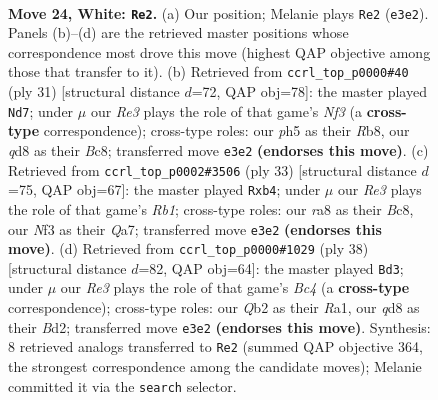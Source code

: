 \documentclass[11pt]{article}
\begin{document}
\clearpage

\begin{figure}[p]\centering
\begin{subfigure}{0.46\textwidth}\centering
\resizebox{\linewidth}{!}{%
\newchessgame
\chessboard[
  setfen={rnbqr1k1/5p2/1p2pnp1/7p/p1PP4/B2BRNPP/PQ3P2/3R2K1 w - - 3 24},
  showmover=false,
  pgfstyle=straightmove, color=movearrow, markmove={e3-e2}
]}
\caption{}
\end{subfigure}\hfill
\begin{subfigure}{0.46\textwidth}\centering
\resizebox{\linewidth}{!}{%
\newchessgame
\chessboard[
  setfen={1rb1r1k1/2p1qpp1/p2p1n1p/P1p5/4PB2/2PP3P/2PN2P1/R2QR1K1 b - - 0 16},
  showmover=false,
  pgfstyle=straightmove, color=movearrow, markmove={f6-d7}
]}
\caption{}
\end{subfigure}
\\[4pt]
\begin{subfigure}{0.46\textwidth}\centering
\resizebox{\linewidth}{!}{%
\newchessgame
\chessboard[
  setfen={1rb1k2r/q3bppp/p1npp3/8/1P2PPPP/1NN5/1PPQ4/1K1R1B1R b k - 0 17},
  showmover=false,
  pgfstyle=straightmove, color=movearrow, markmove={b8-b4}
]}
\caption{}
\end{subfigure}\hfill
\begin{subfigure}{0.46\textwidth}\centering
\resizebox{\linewidth}{!}{%
\newchessgame
\chessboard[
  setfen={r4rk1/1pq1bpp1/2p2n1p/p3pP2/P1B1P3/5RP1/1PPBQ2P/R6K w - - 3 20},
  showmover=false,
  pgfstyle=straightmove, color=movearrow, markmove={c4-d3}
]}
\caption{}
\end{subfigure}
\caption{\textbf{Move 24, White: \texttt{Re2}.} (a) Our position; Melanie plays \texttt{Re2} (\texttt{e3e2}). Panels (b)--(d) are the retrieved master positions whose correspondence most drove this move (highest QAP objective among those that transfer to it). (b) Retrieved from \texttt{ccrl\_top\_p0000\#40} (ply 31) [structural distance $d$=72, QAP obj=78]: the master played \texttt{Nd7}; under $\mu$ our \emph{Re3} plays the role of that game's \emph{Nf3} (a \textbf{cross-type} correspondence); cross-type roles: our \emph{p}h5 as their \emph{R}b8, our \emph{q}d8 as their \emph{B}c8; transferred move \texttt{e3e2} \textbf{(endorses this move)}. (c) Retrieved from \texttt{ccrl\_top\_p0002\#3506} (ply 33) [structural distance $d$=75, QAP obj=67]: the master played \texttt{Rxb4}; under $\mu$ our \emph{Re3} plays the role of that game's \emph{Rb1}; cross-type roles: our \emph{r}a8 as their \emph{B}c8, our \emph{N}f3 as their \emph{Q}a7; transferred move \texttt{e3e2} \textbf{(endorses this move)}. (d) Retrieved from \texttt{ccrl\_top\_p0000\#1029} (ply 38) [structural distance $d$=82, QAP obj=64]: the master played \texttt{Bd3}; under $\mu$ our \emph{Re3} plays the role of that game's \emph{Bc4} (a \textbf{cross-type} correspondence); cross-type roles: our \emph{Q}b2 as their \emph{R}a1, our \emph{q}d8 as their \emph{B}d2; transferred move \texttt{e3e2} \textbf{(endorses this move)}. Synthesis: 8 retrieved analogs transferred to \texttt{Re2} (summed QAP objective 364, the strongest correspondence among the candidate moves); Melanie committed it via the \texttt{search} selector.}
\label{fig:thought-m46}
\end{figure}
\end{document}
